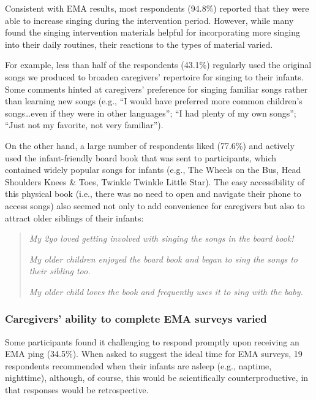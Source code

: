 \documentclass[
]{article}
\begin{document}
Consistent with EMA results, most respondents (94.8\%) reported that
they were able to increase singing during the intervention period.
However, while many found the singing intervention materials helpful for
incorporating more singing into their daily routines, their reactions to
the types of material varied.

For example, less than half of the respondents (43.1\%) regularly used
the original songs we produced to broaden caregivers' repertoire for
singing to their infants. Some comments hinted at caregivers' preference
for singing familiar songs rather than learning new songs (e.g., ``I
would have preferred more common children's songs\ldots even if they
were in other languages''; ``I had plenty of my own songs''; ``Just not
my favorite, not very familiar'').

On the other hand, a large number of respondents liked (77.6\%) and
actively used the infant-friendly board book that was sent to
participants, which contained widely popular songs for infants (e.g.,
The Wheels on the Bus, Head Shoulders Knees \& Toes, Twinkle Twinkle
Little Star). The easy accessibility of this physical book (i.e., there
was no need to open and navigate their phone to access songs) also
seemed not only to add convenience for caregivers but also to attract
older siblings of their infants:

\begin{quote}
\textit{My 2yo loved getting involved with singing the songs in the board book!}
  
\textit{My older children enjoyed the board book and began to sing the songs to their sibling too.}
  
\textit{My older child loves the book and frequently uses it to sing with the baby.}
\end{quote}

\subsubsection*{Caregivers' ability to complete EMA surveys
varied}\label{caregivers-ability-to-complete-ema-surveys-varied}

Some participants found it challenging to respond promptly upon
receiving an EMA ping (34.5\%). When asked to suggest the ideal time for
EMA surveys, 19 respondents recommended when their infants are asleep
(e.g., naptime, nighttime), although, of course, this would be
scientifically counterproductive, in that responses would be
retrospective.
\end{document}

